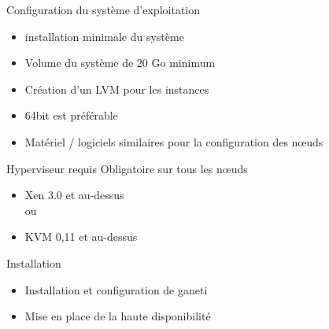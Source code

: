 \begin{frame}{Configuration du système d'exploitation}
\begin{itemize}
\item installation minimale du système
\pause
\item Volume du système de 20 Go minimum
\pause
\item Création d'un LVM pour les instances
\pause
\item 64bit est préférable
\pause
\item Matériel / logiciels similaires pour la configuration des nœuds
\end{itemize}
\end{frame}

\begin{frame}{Hyperviseur requis}
Obligatoire sur tous les nœuds
\begin{itemize}
\item Xen 3.0 et au-dessus \\ou
\pause
\item KVM 0,11 et au-dessus
\end{itemize}
\end{frame}

\begin{frame}{Installation}
\begin{itemize}
\item Installation et configuration de ganeti
\pause
\item Mise en place de la haute disponibilité
\end{itemize}
\end{frame}


